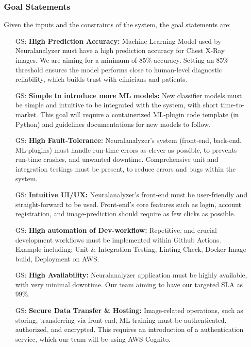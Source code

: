 \documentclass[12pt]{article}
\newcounter{goalnum} %
\begin{document}
\subsubsection{Goal Statements}
\noindent Given the inputs and the constraints of the system, the goal statements are:

\begin{itemize}

\item[GS\refstepcounter{goalnum}\thegoalnum \label{G_prediction_accuracy}:] \textbf{High Prediction Accuracy: }Machine Learning Model used by Neuralanalyzer must have a high prediction accuracy for Chest X-Ray images. We are aiming for a minimum of 85\% accuracy. Setting an 85\% threshold ensures the model performs close to human-level diagnostic reliability, which builds trust with clinicians and patients.
\item[GS\refstepcounter{goalnum}\thegoalnum \label{G_ease_of_ML_intro}:] \textbf{Simple to introduce more ML models: }New classifier models must be simple and intuitive to be integrated with the system, with short time-to-market. This goal will require a containerized ML-plugin code template (in Python) and guidelines documentations for new models to follow.
\item[GS\refstepcounter{goalnum}\thegoalnum \label{G_fault-tolerance}:] \textbf{High Fault-Tolerance: }Neuralanalyzer's system (front-end, back-end, ML-plugins) must handle run-time errors as clever as possible, to prevents run-time crashes, and unwanted downtime. Comprehensive unit and integration testings must be present, to reduce errors and bugs within the system.
\item[GS\refstepcounter{goalnum}\thegoalnum \label{G_good_UI}:] \textbf{Intuitive UI/UX: }Neuralanalyzer's front-end must be user-friendly and straight-forward to be used. Front-end's core features such as login, account registration, and image-prediction should require as few clicks as possible.
\item[GS\refstepcounter{goalnum}\thegoalnum \label{G_dev_work_automation}:] \textbf{High automation of Dev-workflow: }Repetitive, and crucial development workflows must be implemented within Github Actions. Example including: Unit \& Integration Testing, Linting Check, Docker Image build, Deployment on AWS.
\item[GS\refstepcounter{goalnum}\thegoalnum \label{G_avaialblity}:] \textbf{High Availability: }Neuralanalyzer application must be highly available, with very minimal downtime. Our team aiming to have our targeted SLA as 99\%.
\item[GS\refstepcounter{goalnum}\thegoalnum \label{G_data_security}:] \textbf{Secure Data Transfer \& Hosting: }Image-related operations, such as storing, transferring via front-end, ML-training must be authenticated, authorized, and encrypted. This requires an introduction of a authentication service, which our team will be using AWS Cognito.

\end{itemize}
\newpage
\end{document}
